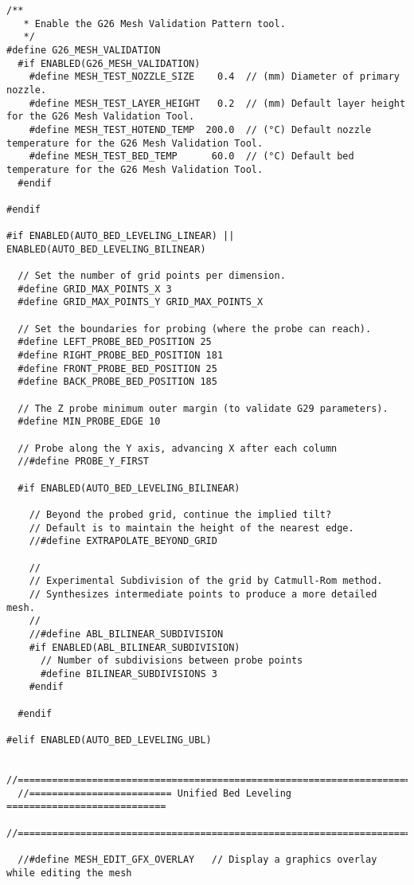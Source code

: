 \begin{lstlisting}[caption = キャプション, label = ラベル]
  /**
   * Enable the G26 Mesh Validation Pattern tool.
   */
#define G26_MESH_VALIDATION
  #if ENABLED(G26_MESH_VALIDATION)
    #define MESH_TEST_NOZZLE_SIZE    0.4  // (mm) Diameter of primary nozzle.
    #define MESH_TEST_LAYER_HEIGHT   0.2  // (mm) Default layer height for the G26 Mesh Validation Tool.
    #define MESH_TEST_HOTEND_TEMP  200.0  // (°C) Default nozzle temperature for the G26 Mesh Validation Tool.
    #define MESH_TEST_BED_TEMP      60.0  // (°C) Default bed temperature for the G26 Mesh Validation Tool.
  #endif

#endif

#if ENABLED(AUTO_BED_LEVELING_LINEAR) || ENABLED(AUTO_BED_LEVELING_BILINEAR)

  // Set the number of grid points per dimension.
  #define GRID_MAX_POINTS_X 3
  #define GRID_MAX_POINTS_Y GRID_MAX_POINTS_X

  // Set the boundaries for probing (where the probe can reach).
  #define LEFT_PROBE_BED_POSITION 25
  #define RIGHT_PROBE_BED_POSITION 181
  #define FRONT_PROBE_BED_POSITION 25
  #define BACK_PROBE_BED_POSITION 185

  // The Z probe minimum outer margin (to validate G29 parameters).
  #define MIN_PROBE_EDGE 10

  // Probe along the Y axis, advancing X after each column
  //#define PROBE_Y_FIRST

  #if ENABLED(AUTO_BED_LEVELING_BILINEAR)

    // Beyond the probed grid, continue the implied tilt?
    // Default is to maintain the height of the nearest edge.
    //#define EXTRAPOLATE_BEYOND_GRID

    //
    // Experimental Subdivision of the grid by Catmull-Rom method.
    // Synthesizes intermediate points to produce a more detailed mesh.
    //
    //#define ABL_BILINEAR_SUBDIVISION
    #if ENABLED(ABL_BILINEAR_SUBDIVISION)
      // Number of subdivisions between probe points
      #define BILINEAR_SUBDIVISIONS 3
    #endif

  #endif

#elif ENABLED(AUTO_BED_LEVELING_UBL)

  //===========================================================================
  //========================= Unified Bed Leveling ============================
  //===========================================================================

  //#define MESH_EDIT_GFX_OVERLAY   // Display a graphics overlay while editing the mesh


\end{lstlisting}
